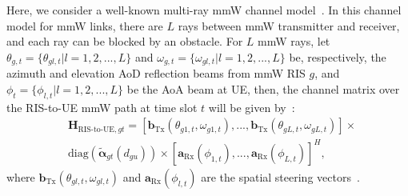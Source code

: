 \documentclass[conference]{IEEEtran}
\begin{document}
Here, we consider a well-known multi-ray mmW channel model~\cite{Shahmansoori2018}. In this channel model for mmW links, there are $L$ rays between mmW transmitter and receiver, and each ray can be blocked by an obstacle. For $L$ mmW rays, let $\theta_{g,t}=\{\theta_{gl,t}|l=1,2,...,L\}$ and $\omega_{g,t}=\{\omega_{gl,t}|l=1,2,...,L\}$  be, respectively, the azimuth and elevation AoD reflection beams from mmW RIS $g$, and $\phi_{t}=\{\phi_{l,t}|l=1,2,...,L\}$ be the AoA beam at UE, then, the channel matrix over the RIS-to-UE mmW path at time slot $t$ will be given by~\cite{Shahmansoori2018}:
\begin{align}
&\boldsymbol{H}_{\text{RIS-to-UE},gt}= [\boldsymbol{b}_{\text{Tx}}(\theta_{g1,t},\omega_{g1,t}),...,\boldsymbol{b}_{\text{Tx}}(\theta_{gL,t},\omega_{gL,t})] \times \nonumber \\ &\text{diag}( \tilde{\boldsymbol{\alpha}}_{gt}(d_{gu})) \times
 [\boldsymbol{a}_{\text{Rx}}(\phi_{1,t}),...,\boldsymbol{a}_{\text{Rx}}(\phi_{L,t})]^H,
 \label{RIS2UE}
\end{align}
where $\boldsymbol{b}_{\text{Tx}}(\theta_{gl,t},\omega_{gl,t})$ and $\boldsymbol{a}_{\text{Rx}}(\phi_{l,t})$ are the spatial steering vectors~\cite{two}.
\end{document}
